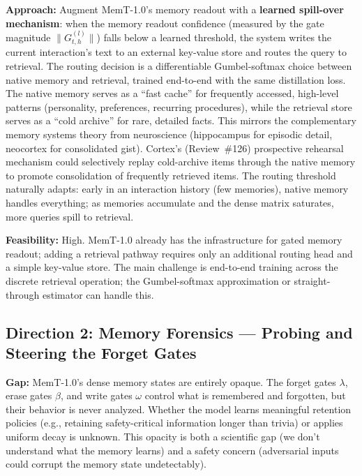 \documentclass[11pt,a4paper]{article}
\begin{document}
\textbf{Approach:} Augment MemT-1.0's memory readout with a \textbf{learned spill-over mechanism}: when the memory readout confidence (measured by the gate magnitude $\|G^{(l)}_{t,h}\|$) falls below a learned threshold, the system writes the current interaction's text to an external key-value store and routes the query to retrieval. The routing decision is a differentiable Gumbel-softmax choice between native memory and retrieval, trained end-to-end with the same distillation loss. The native memory serves as a ``fast cache'' for frequently accessed, high-level patterns (personality, preferences, recurring procedures), while the retrieval store serves as a ``cold archive'' for rare, detailed facts. This mirrors the complementary memory systems theory from neuroscience (hippocampus for episodic detail, neocortex for consolidated gist). Cortex's (Review~\#126) prospective rehearsal mechanism could selectively replay cold-archive items through the native memory to promote consolidation of frequently retrieved items. The routing threshold naturally adapts: early in an interaction history (few memories), native memory handles everything; as memories accumulate and the dense matrix saturates, more queries spill to retrieval.

\textbf{Feasibility:} High. MemT-1.0 already has the infrastructure for gated memory readout; adding a retrieval pathway requires only an additional routing head and a simple key-value store. The main challenge is end-to-end training across the discrete retrieval operation; the Gumbel-softmax approximation or straight-through estimator can handle this.

\subsection{Direction 2: Memory Forensics --- Probing and Steering the Forget Gates}
\textbf{Gap:} MemT-1.0's dense memory states are entirely opaque. The forget gates $\lambda$, erase gates $\beta$, and write gates $\omega$ control what is remembered and forgotten, but their behavior is never analyzed. Whether the model learns meaningful retention policies (e.g., retaining safety-critical information longer than trivia) or applies uniform decay is unknown. This opacity is both a scientific gap (we don't understand what the memory learns) and a safety concern (adversarial inputs could corrupt the memory state undetectably).
\end{document}

